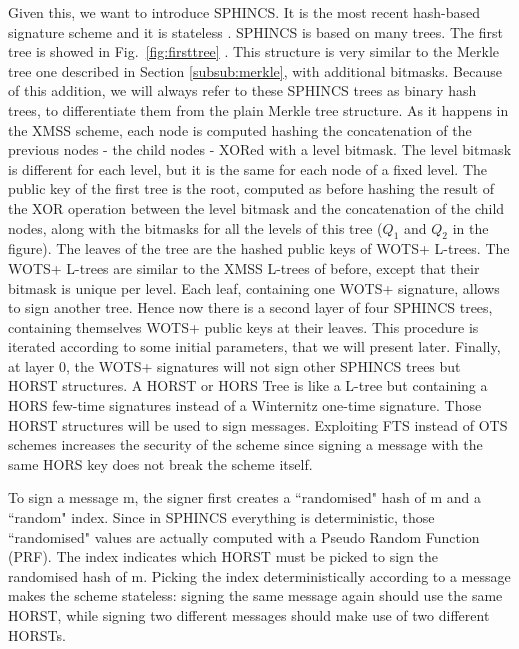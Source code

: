 \documentclass[a4paper,12pt]{article}
\def\myfig#1{Fig.~#1\xspace}
\begin{document}
Given this, we want to introduce SPHINCS. It is the most recent hash-based signature scheme and it is stateless \cite{53_hbs}. SPHINCS is based on many trees. The first tree is showed in \myfig{\ref{fig:firsttree}} . This structure is very similar to the Merkle tree one described in Section \ref{subsub:merkle}, with additional bitmasks. Because of this addition, we will always refer to these SPHINCS trees as binary hash trees, to differentiate them from the plain Merkle tree structure.
As it happens in the XMSS scheme, each node is computed hashing the concatenation of the previous nodes - the child nodes - XORed with a level bitmask. The level bitmask is different for each level, but it is the same for each node of a fixed level.
The public key of the first tree is the root, computed as before hashing the result of the XOR operation between the level bitmask and the concatenation of the child nodes, along with the bitmasks for all the levels of this tree ($Q_{1}$ and $Q_{2}$ in the figure).
The leaves of the tree are the hashed public keys of WOTS+ L-trees.
The WOTS+ L-trees are similar to the XMSS L-trees of before, except that their bitmask is unique per level.
Each leaf, containing one WOTS+ signature, allows to sign another tree. Hence now there is a second layer of four SPHINCS trees, containing themselves WOTS+ public keys at their leaves. This procedure is iterated according to some initial parameters, that we will present later. Finally, at layer 0, the WOTS+ signatures will not sign other SPHINCS trees but HORST structures.
A HORST or HORS Tree is like a L-tree but containing a HORS few-time signatures instead of a Winternitz one-time signature. Those HORST structures will be used to sign messages. Exploiting FTS instead of OTS schemes increases the security of the scheme since signing a message with the same HORS key does not break the scheme itself.

To sign a message m, the signer first creates a ``randomised" hash of m and a ``random" index. Since in SPHINCS everything is deterministic, those ``randomised" values are actually computed with a Pseudo Random Function (PRF). The index indicates which HORST must be picked to sign the randomised hash of m. Picking the index deterministically according to a message makes the scheme stateless: signing the same message again should use the same HORST, while signing two different messages should make use of two different HORSTs. 
\end{document}
